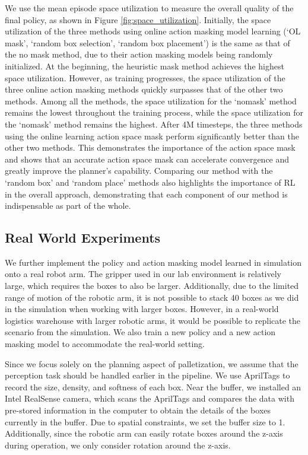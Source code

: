 We use the mean episode space utilization to measure the overall quality of the final policy, as shown in Figure \ref{fig:space_utilization}. 
Initially, the space utilization of the three methods using online action masking model learning (`OL mask', `random box selection', `random box placement') is the same as that of the no mask method, due to their action masking models being randomly initialized. At the beginning, the heuristic mask method achieves the highest space utilization. However, as training progresses, the space utilization of the three online action masking methods quickly surpasses that of the other two methods.
Among all the methods, the space utilization for the `nomask' method remains the lowest throughout the training process, while the space utilization for the `nomask' method remains the highest. After 4M timesteps, the three methods using the online learning action space mask perform significantly better than the other two methods. This demonstrates the importance of the action space mask and shows that an accurate action space mask can accelerate convergence and greatly improve the planner's capability. Comparing our method with the `random box' and `random place' methods also highlights the importance of RL in the overall approach, demonstrating that each component of our method is indispensable as part of the whole.

\subsection{Real World Experiments}
We further implement the policy and action masking model learned in simulation onto a real robot arm. The gripper used in our lab environment is relatively large, which requires the boxes to also be larger. Additionally, due to the limited range of motion of the robotic arm, it is not possible to stack 40 boxes as we did in the simulation when working with larger boxes. However, in a real-world logistics warehouse with larger robotic arms, it would be possible to replicate the scenario from the simulation. We also train a new policy and a new action masking model to accommodate the real-world setting.

Since we focus solely on the planning aspect of palletization, we assume that the perception task should be handled earlier in the pipeline. We use AprilTags \cite{wang2016apriltag} to record the size, density, and softness of each box. Near the buffer, we installed an Intel RealSense camera, which scans the AprilTags and compares the data with pre-stored information in the computer to obtain the details of the boxes currently in the buffer. Due to spatial constraints, we set the buffer size to 1. Additionally, since the robotic arm can easily rotate boxes around the z-axis during operation, we only consider rotation around the z-axis.

